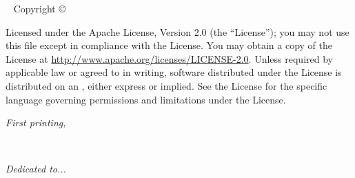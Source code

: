 \frontmatter

\blankpage

\newpage\thispagestyle{empty}
\vfill
{}

\maketitle

\newpage
\begin{fullwidth}
~\vfill
\thispagestyle{empty}
\setlength{\parindent}{0pt}
\setlength{\parskip}{\baselineskip}
Copyright \copyright\ \the\year\ \thanklessauthor

\par{}

\par{}

\par Licensed under the Apache License, Version 2.0 (the ``License''); you may not use this file except in compliance with the License. You may obtain a copy of the License at \url{http://www.apache.org/licenses/LICENSE-2.0}. Unless required by applicable law or agreed to in writing, software distributed under the License is distributed on an , either express or implied. See the License for the specific language governing permissions and limitations
under the License.

\par\textit{First printing, \monthyear}
\end{fullwidth}

\tableofcontents

\cleardoublepage
~\vfill
\begin{doublespace}
\noindent\fontsize{18}{22}\selectfont\itshape
\nohyphenation
Dedicated to...
\end{doublespace}
\vfill
\vfill


\cleardoublepage




